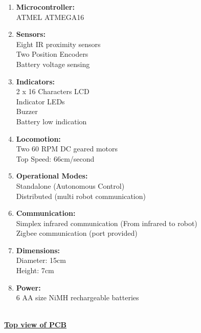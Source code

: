 \documentclass[a4paper,12pt,oneside]{book}
\begin{document}
	\begin{enumerate}
		\item{\textbf{\large{Microcontroller:}}\\ATMEL ATMEGA16}
		\item{\textbf{\large{Sensors:}}\\Eight IR proximity sensors\\Two Position Encoders\\Battery voltage sensing}
		\item{\textbf{\large{Indicators:}}\\2 x 16 Characters LCD\\
			Indicator LEDs\\
			Buzzer\\
			Battery low indication}\\
		\item{\textbf{\large{Locomotion:}}\\Two 60 RPM DC geared motors\\Top Speed: 66cm/second\\}
		\item{\textbf{\large{Operational Modes:}}\\Standalone (Autonomous Control)\\
			Distributed (multi robot communication)\\} 
		\item{\textbf{\large{Communication:}}\\Simplex infrared communication (From infrared to robot)\\
		Zigbee communication (port provided)\\} 
		\item{\textbf{\large{Dimensions:}}\\Diameter: 15cm\\
			Height: 7cm\\} 
		\item{\textbf{\large{Power:}}\\6 AA size NiMH rechargeable batteries} 
	\end{enumerate}
	\newpage
	\hfill\\	
	\underline{\textbf{\Large{Top view of PCB}}}
\end{document}

